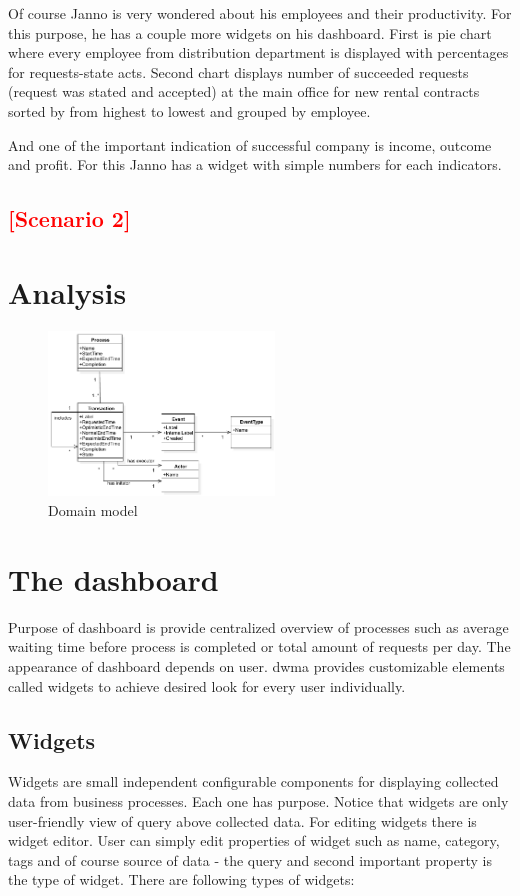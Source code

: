 \documentclass[thesis=B,english]{FITthesis}[2012/06/26]
\newcommand{\todo}[1]{\textcolor{red}{\textbf{[#1]}}}
\begin{document}
    Of course Janno is very wondered about his employees and their productivity. For this purpose, he has a couple more widgets on his dashboard. First is pie chart where every employee from distribution department is displayed with percentages for requests-state acts. Second chart displays number of succeeded requests (request was stated and accepted) at the main office for new rental contracts sorted by from highest to lowest and grouped by employee.
   
   And one of the important indication of successful company is income, outcome and profit. For this Janno has a widget with simple numbers for each indicators.  
   
    
    \subsection{\todo{Scenario 2}}   
    
    \section{Analysis}    

    \begin{figure}[h]
        \centering
        \includegraphics[width=6cm,keepaspectratio]{img/domain-core-model}
        \caption{Domain model}
        \label{fig:domain-core-model}
    \end{figure}  

	\section{The dashboard}
    Purpose of dashboard is provide centralized overview of processes such as average waiting time before process is completed or total amount of requests per day. The appearance of dashboard depends on user. \gls{dwma} provides customizable elements called widgets to achieve desired look for every user individually.

    \subsection{Widgets}  
     Widgets are small independent configurable components for displaying collected data from business processes. Each one has purpose. Notice that widgets are only user-friendly view of query above collected data. For editing widgets there is widget editor. User can simply edit properties of widget such as name, category, tags and of course source of data - the query and second important property is the type of widget. There are following types of widgets:
     
\end{document}
